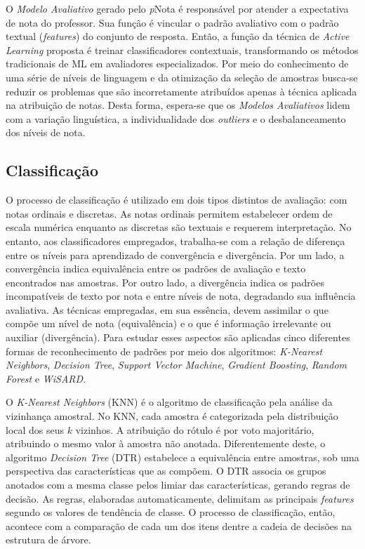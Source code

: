O \textit{Modelo Avaliativo} gerado pelo \textit{p}Nota é responsável por atender a expectativa de nota do professor. Sua função é vincular o padrão avaliativo com o padrão textual (\textit{features}) do conjunto de resposta. Então, a função da técnica de \textit{Active Learning} proposta é treinar classificadores contextuais, transformando os métodos tradicionais de ML em avaliadores especializados. Por meio do conhecimento de uma série de níveis de linguagem e da otimização da seleção de amostras busca-se reduzir os problemas que são incorretamente atribuídos apenas à técnica aplicada na atribuição de notas. Desta forma, espera-se que os \textit{Modelos Avaliativos} lidem com a variação linguística, a individualidade dos \textit{outliers} e o desbalanceamento dos níveis de nota.


\subsection{Classificação}
\label{subsec-classificacao}

O processo de classificação é utilizado em dois tipos distintos de avaliação: com notas ordinais e discretas. As notas ordinais permitem estabelecer ordem de escala numérica enquanto as discretas são textuais e requerem interpretação. No entanto, aos classificadores empregados, trabalha-se com a relação de diferença entre os níveis para aprendizado de convergência e divergência. Por um lado, a convergência indica equivalência entre os padrões de avaliação e texto encontrados nas amostras. Por outro lado, a divergência indica os padrões incompatíveis de texto por nota e entre níveis de nota, degradando sua influência avaliativa. As técnicas empregadas, em sua essência, devem assimilar o que compõe um nível de nota (equivalência) e o que é informação irrelevante ou auxiliar (divergência). Para estudar esses aspectos são aplicadas cinco diferentes formas de reconhecimento de padrões por meio dos algoritmos: \textit{K-Nearest Neighbors}, \textit{Decision Tree}, \textit{Support Vector Machine}, \textit{Gradient Boosting}, \textit{Random Forest} e \textit{WiSARD}.

O \textit{K-Nearest Neighbors} (KNN) é o algoritmo de classificação pela análise da vizinhança amostral. No KNN, cada amostra é categorizada pela distribuição local dos seus $ k $ vizinhos. A atribuição do rótulo é por voto majoritário, atribuindo o mesmo valor à amostra não anotada. Diferentemente deste, o algoritmo \textit{Decision Tree} (DTR) estabelece a equivalência entre amostras, sob uma perspectiva das características que as compõem. O DTR associa os grupos anotados com a mesma classe pelos limiar das características, gerando regras de decisão. As regras, elaboradas automaticamente, delimitam as principais \textit{features} segundo os valores de tendência de classe. O processo de classificação, então, acontece com a comparação de cada um dos itens dentre a cadeia de decisões na estrutura de árvore.

